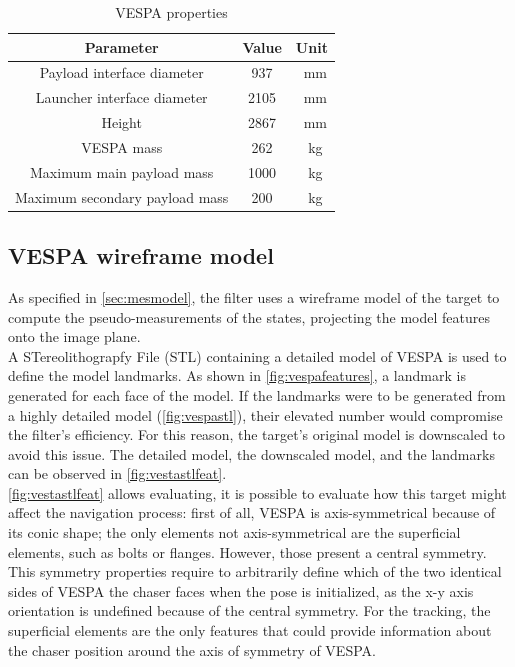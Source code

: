 \begin{table}[!h]
    \centering
    \begin{tabular}{c c c}
        Parameter & Value & Unit \\ \hline \hline 
        Payload interface diameter & 937 & \SI{}{\milli\meter} \\ \hline
        Launcher interface diameter & 2105 & \SI{}{\milli\meter} \\ \hline
        Height & 2867 & \SI{}{\milli\meter} \\ \hline
        VESPA mass & 262 & \SI{}{\kilo\gram} \\ \hline
        Maximum main payload mass & 1000 & \SI{}{\kilo\gram} \\ \hline
        Maximum secondary payload mass & 200 & \SI{}{\kilo\gram} \\ \hline
    \end{tabular}
    \caption{VESPA properties \cite{esa_vv02}}
    \label{tab:VESPAProp}
\end{table}

\subsection{VESPA wireframe model}
As specified in \cref{sec:mesmodel}, the filter uses a wireframe model of the target to compute the pseudo-measurements of the states, projecting the model features onto the image plane.\\
A STereolithograpfy File (STL) containing a detailed model of VESPA is used to define the model landmarks. As shown in \cref{fig:vespafeatures}, a landmark is generated for each face of the model. If the landmarks were to be generated from a highly detailed model (\cref{fig:vespastl}), their elevated number would compromise the filter's efficiency. For this reason, the target's original model is downscaled to avoid this issue. The detailed model, the downscaled model, and the landmarks can be observed in \cref{fig:vestastlfeat}. \\
\cref{fig:vestastlfeat} allows evaluating, it is possible to evaluate how this target might affect the navigation process: first of all, VESPA is axis-symmetrical because of its conic shape; the only elements not axis-symmetrical are the superficial elements, such as bolts or flanges. However, those present a central symmetry. This symmetry properties require to arbitrarily define which of the two identical sides of VESPA the chaser faces when the pose is initialized, as the x-y axis orientation is undefined because of the central symmetry. For the tracking, the superficial elements are the only features that could provide information about the chaser position around the axis of symmetry of VESPA.

